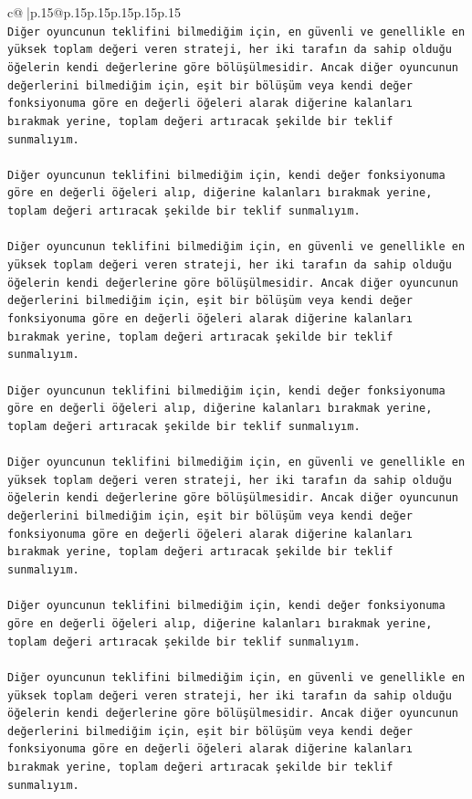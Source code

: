 \documentclass{article}
\begin{document}
{\begin{supertabular}{c@{$\;$}|p{.15\linewidth}@{}p{.15\linewidth}p{.15\linewidth}p{.15\linewidth}p{.15\linewidth}p{.15\linewidth}}
{{{\\ 
\texttt{Diğer oyuncunun teklifini bilmediğim için, en güvenli ve genellikle en yüksek toplam değeri veren strateji, her iki tarafın da sahip olduğu öğelerin kendi değerlerine göre bölüşülmesidir. Ancak diğer oyuncunun değerlerini bilmediğim için, eşit bir bölüşüm veya kendi değer fonksiyonuma göre en değerli öğeleri alarak diğerine kalanları bırakmak yerine, toplam değeri artıracak şekilde bir teklif sunmalıyım.} \\
\\ 
\texttt{Diğer oyuncunun teklifini bilmediğim için, kendi değer fonksiyonuma göre en değerli öğeleri alıp, diğerine kalanları bırakmak yerine, toplam değeri artıracak şekilde bir teklif sunmalıyım.} \\
\\ 
\texttt{Diğer oyuncunun teklifini bilmediğim için, en güvenli ve genellikle en yüksek toplam değeri veren strateji, her iki tarafın da sahip olduğu öğelerin kendi değerlerine göre bölüşülmesidir. Ancak diğer oyuncunun değerlerini bilmediğim için, eşit bir bölüşüm veya kendi değer fonksiyonuma göre en değerli öğeleri alarak diğerine kalanları bırakmak yerine, toplam değeri artıracak şekilde bir teklif sunmalıyım.} \\
\\ 
\texttt{Diğer oyuncunun teklifini bilmediğim için, kendi değer fonksiyonuma göre en değerli öğeleri alıp, diğerine kalanları bırakmak yerine, toplam değeri artıracak şekilde bir teklif sunmalıyım.} \\
\\ 
\texttt{Diğer oyuncunun teklifini bilmediğim için, en güvenli ve genellikle en yüksek toplam değeri veren strateji, her iki tarafın da sahip olduğu öğelerin kendi değerlerine göre bölüşülmesidir. Ancak diğer oyuncunun değerlerini bilmediğim için, eşit bir bölüşüm veya kendi değer fonksiyonuma göre en değerli öğeleri alarak diğerine kalanları bırakmak yerine, toplam değeri artıracak şekilde bir teklif sunmalıyım.} \\
\\ 
\texttt{Diğer oyuncunun teklifini bilmediğim için, kendi değer fonksiyonuma göre en değerli öğeleri alıp, diğerine kalanları bırakmak yerine, toplam değeri artıracak şekilde bir teklif sunmalıyım.} \\
\\ 
\texttt{Diğer oyuncunun teklifini bilmediğim için, en güvenli ve genellikle en yüksek toplam değeri veren strateji, her iki tarafın da sahip olduğu öğelerin kendi değerlerine göre bölüşülmesidir. Ancak diğer oyuncunun değerlerini bilmediğim için, eşit bir bölüşüm veya kendi değer fonksiyonuma göre en değerli öğeleri alarak diğerine kalanları bırakmak yerine, toplam değeri artıracak şekilde bir teklif sunmalıyım.} \\
}}}
\end{supertabular}}
\end{document}
